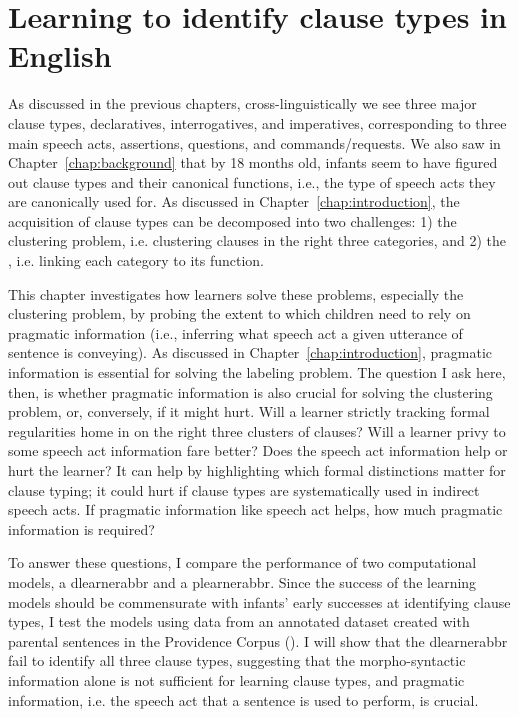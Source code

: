 \chapter{Learning to identify clause types in English}
\label{chap:eng-cl}


As discussed in the previous chapters, cross-linguistically we see three major clause types, declaratives, interrogatives, and imperatives, corresponding to three main speech acts, assertions, questions, and commands/requests. We also saw in Chapter~\ref{chap:background} that by 18 months old, infants seem to have figured out clause types and their canonical functions, i.e., the type of speech acts they are canonically used for.  As discussed in Chapter~\ref{chap:introduction}, the acquisition of clause types can be decomposed into two challenges: 1) the clustering problem, i.e. clustering clauses in the right three categories, and 2) the , i.e. linking each category to its function. 

This chapter investigates how learners solve these problems, especially the clustering problem, by probing the extent to which children need to rely on pragmatic information (i.e., inferring what speech act a given utterance of sentence is conveying). As discussed in Chapter~\ref{chap:introduction}, pragmatic information is essential for solving the labeling problem. The question I ask here, then, is whether pragmatic information is also crucial for solving the clustering problem, or, conversely, if it might hurt. Will a learner strictly tracking formal regularities home in on the right three clusters of clauses? Will a learner privy to some speech act information fare better? Does the speech act information help or hurt the learner? It can help by highlighting which formal distinctions matter for clause typing; it could hurt if clause types are systematically used in indirect speech acts. If pragmatic information like speech act helps, how much pragmatic information is required? 

To answer these questions, I compare the performance of two computational models, a \gls{dlearnerabbr} and a \gls{plearnerabbr}. Since the success of the learning models should be commensurate with infants' early successes at identifying clause types, I test the models using data from an annotated dataset created with parental sentences in the Providence Corpus (\cite{ProvidenceCorpus}). I will show that the \gls{dlearnerabbr} fail to identify all three clause types, suggesting that the morpho-syntactic information alone is not sufficient for learning clause types, and pragmatic information, i.e. the speech act that a sentence is used to perform, is crucial.

